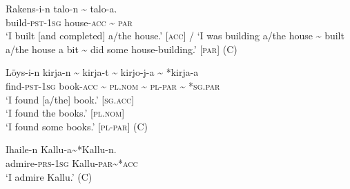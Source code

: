 \documentclass[output=paper]{LSP/langsci}
\begin{document}
\ea
\label{15-hu-ex:20}

\gll Rakens-i-n talo-n {\textasciitilde} talo-a.\\
 build-\textsc{pst}-\textsc{1sg} house-\textsc{acc} {\textasciitilde} \textsc{par}\\
\glt ‘I built [and completed] a/the house.’ [\textsc{acc}] / ‘I was building a/the house {\textasciitilde} built a/the house a bit {\textasciitilde} did some house-building.’ [\textsc{par}] (C)
\z

\ea
\label{15-hu-ex:21}

\gll Löys-i-n kirja-n {\textasciitilde} kirja-t {\textasciitilde} kirjo-j-a {\textasciitilde} *kirja-a\\
 find-\textsc{pst}-\textsc{1sg} book-\textsc{acc} {\textasciitilde} \textsc{pl}.\textsc{nom} {\textasciitilde} \textsc{pl}-\textsc{par} {\textasciitilde} *\textsc{sg}.\textsc{par}\\
\glt  ‘I found [a/the] book.’ [\textsc{sg}.\textsc{acc}]\\
 ‘I found the books.’ [\textsc{pl}.\textsc{nom}]\\
 ‘I found some books.’ [\textsc{pl}-\textsc{par}] (C)\\
\z

\ea
\label{15-hu-ex:22}

\gll Ihaile-n Kallu-a{\textasciitilde}*Kallu-n.\\
 admire-\textsc{prs}-\textsc{1sg} Kallu-\textsc{par}{\textasciitilde}*\textsc{acc}\\
\glt  ‘I admire Kallu.’ (C)
\z
\end{document}

